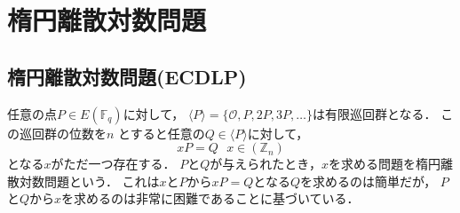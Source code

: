 \section{楕円離散対数問題}
\par
\subsection{楕円離散対数問題(ECDLP)}
\par
任意の点$P\in E(\mathbb{F}_q)$に対して，
$\langle P\rangle =\{\mathcal{O},P,2P,3P,\ldots \}$は有限巡回群となる．
この巡回群の位数を$n$
とすると任意の$Q\in \langle P\rangle$に対して，
\[
xP=Q\ \ \ x\in (\mathbb{Z}_n)
\]
となる$x$がただ一つ存在する．
$P$と$Q$が与えられたとき，$x$を求める問題を楕円離散対数問題という．
これは$x$と$P$から$xP=Q$となる$Q$を求めるのは簡単だが，
$P$と$Q$から$x$を求めるのは非常に困難であることに基づいている．\\
\par
